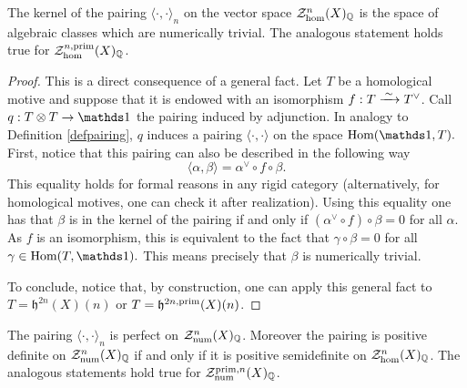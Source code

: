 \documentclass[11pt]{amsart}
\begin{document}
\begin{prop}\label{kerpairing}
The kernel of the pairing $\langle \cdot, \cdot \rangle_{n}$  on the vector space $\mathcal{Z}_{\hom}^{n}(X)_{\mathbb{Q}}$ is the space of algebraic classes  which are numerically trivial. The analogous statement holds true for $\mathcal{Z}_{\hom}^{n,\mathrm{prim}}(X)_{\mathbb{Q}}$.
\end{prop}
\begin{proof}

This is a direct consequence of a general fact. Let $T$ be a homological motive and suppose that it is endowed with an isomorphism
$f:T \xrightarrow{\hspace{1.85pt}\sim \hspace{1.85pt}} T^\vee$. Call $q: T \otimes T \rightarrow \one $ the pairing induced by adjunction. In analogy to Definition \ref{defpairing}, $q$ induces a pairing $\langle \cdot , \cdot \rangle$ on the space $\Hom(\one, T).$ First, notice that this pairing can also be described in the following way
\[\langle \alpha,\beta\rangle=\alpha^\vee \circ f \circ \beta.\]
This equality holds for formal reasons in any rigid category (alternatively, for homological motives, one can check it after realization).
Using this equality one has that $\beta$ is in the kernel of the pairing if and only if  $(\alpha^\vee \circ f) \circ \beta=0$ for all $\alpha$. As $f$ is an isomorphism, this is equivalent to the fact that $\gamma \circ \beta=0$ for all $\gamma\in\Hom(T,\one).$ This means precisely that $\beta$ is numerically trivial.

To conclude, notice that, by construction, one can apply this general fact to $T= \mathfrak{h}^{2n}(X)(n)$ or $T= \mathfrak{h}^{2n,\mathrm{prim}}(X)(n)$.
\end{proof}
\begin{corollary}\label{semipos} 
The pairing $\langle \cdot, \cdot \rangle_{n}$  is perfect on $\mathcal{Z}_{\mathrm{num}}^{n}(X)_{\mathbb{Q}}$. Moreover the pairing  is positive definite on  $\mathcal{Z}_{\mathrm{num}}^{n}(X)_{\mathbb{Q}}$ if and only if it is positive semidefinite on $\mathcal{Z}_{\hom}^{n}(X)_{\mathbb{Q}}$. The analogous statements hold true for $\mathcal{Z}_{\mathrm{num}}^{\mathrm{prim},n}(X)_{\mathbb{Q}}$.
\end{corollary}
\end{document}
